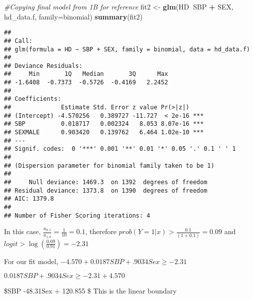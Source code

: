 \documentclass[]{article}
\newenvironment{Shaded}{\begin{snugshade}}{\end{snugshade}}
\newcommand{\KeywordTok}[1]{\textcolor[rgb]{0.13,0.29,0.53}{\textbf{#1}}}
\newcommand{\DataTypeTok}[1]{\textcolor[rgb]{0.13,0.29,0.53}{#1}}
\newcommand{\StringTok}[1]{\textcolor[rgb]{0.31,0.60,0.02}{#1}}
\newcommand{\CommentTok}[1]{\textcolor[rgb]{0.56,0.35,0.01}{\textit{#1}}}
\newcommand{\OperatorTok}[1]{\textcolor[rgb]{0.81,0.36,0.00}{\textbf{#1}}}
\newcommand{\NormalTok}[1]{#1}
\begin{document}
\begin{Shaded}
\begin{Highlighting}[]
\CommentTok{#Copying final model from 1B for reference}
\NormalTok{fit2 <-}\StringTok{ }\KeywordTok{glm}\NormalTok{(HD}\OperatorTok{~}\NormalTok{SBP }\OperatorTok{+}\StringTok{ }\NormalTok{SEX, hd_data.f, }\DataTypeTok{family=}\NormalTok{binomial)}
\KeywordTok{summary}\NormalTok{(fit2)}
\end{Highlighting}
\end{Shaded}

\begin{verbatim}
## 
## Call:
## glm(formula = HD ~ SBP + SEX, family = binomial, data = hd_data.f)
## 
## Deviance Residuals: 
##     Min       1Q   Median       3Q      Max  
## -1.6408  -0.7373  -0.5726  -0.4169   2.2452  
## 
## Coefficients:
##              Estimate Std. Error z value Pr(>|z|)    
## (Intercept) -4.570256   0.389727 -11.727  < 2e-16 ***
## SBP          0.018717   0.002324   8.053 8.07e-16 ***
## SEXMALE      0.903420   0.139762   6.464 1.02e-10 ***
## ---
## Signif. codes:  0 '***' 0.001 '**' 0.01 '*' 0.05 '.' 0.1 ' ' 1
## 
## (Dispersion parameter for binomial family taken to be 1)
## 
##     Null deviance: 1469.3  on 1392  degrees of freedom
## Residual deviance: 1373.8  on 1390  degrees of freedom
## AIC: 1379.8
## 
## Number of Fisher Scoring iterations: 4
\end{verbatim}

In this case, \(\frac{a_{0,1}}{a_{1,0}}=\frac{1}{10}=0.1\), therefore
\(prob(Y=1 \vert x) > \frac{0.1}{(1+0.1)}=0.09\) and
\(logit > \log(\frac{0.09}{0.91})=-2.31\)

For our fit model, \(-4.570+0.0187SBP+.9034Sex \geq -2.31\)

\(0.0187SBP+.9034Sex \geq -2.31+4.570\)

\$SBP \geq -48.31Sex + 120.855 \$ This is the linear boundary
\end{document}
